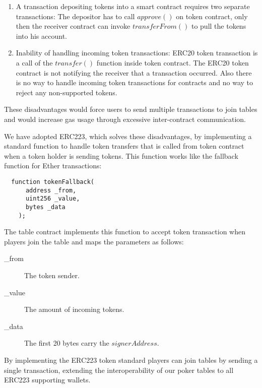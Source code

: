 \begin{enumerate}
\item A transaction depositing tokens into a smart contract requires two separate transactions: The depositor has to call \(approve()\) on token contract, only then the receiver contract can invoke \(transferFrom()\) to pull the tokens into his account.
\item Inability of handling incoming token transactions: ERC20 token transaction is a call of the \(transfer()\) function inside token contract. The ERC20 token contract is not notifying the receiver that a transaction occurred. Also there is no way to handle incoming token transactions for contracts and no way to reject any non-supported tokens.
\end{enumerate}

These disadvantages would force users to send multiple transactions to join tables and would increase gas usage through excessive inter-contract communication.

We have adopted ERC223, which solves these disadvantages, by implementing a standard function to handle token transfers that is called from token contract when a token holder is sending tokens. This function works like the fallback function for Ether transactions:

\begin{verbatim}
  function tokenFallback(
      address _from,
      uint256 _value,
      bytes _data
    );
\end{verbatim}

The table contract implements this function to accept token transaction when players join the table and maps the parameters as follows:

\begin{description}
\item[\_from] The token sender.
\item[\_value] The amount of incoming tokens.
\item[\_data] The first 20 bytes carry the \(signerAddress\).
\end{description}

By implementing the ERC223 token standard players can join tables by sending a single transaction, extending the interoperability of our poker tables to all ERC223 supporting wallets.


